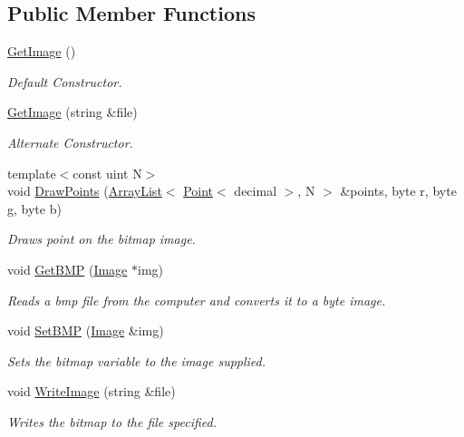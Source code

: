 \subsection*{Public Member Functions}
\begin{DoxyCompactItemize}
\item 
\mbox{\label{classnix_1_1GetImage_a536cbe8b7e89fac6c9b7bf2b85866a44}} 
\hyperlink{classnix_1_1GetImage_a536cbe8b7e89fac6c9b7bf2b85866a44}{Get\+Image} ()
\begin{DoxyCompactList}\small\item\em Default Constructor. \end{DoxyCompactList}\item 
\hyperlink{classnix_1_1GetImage_aa56441c4e8c2ad40725e4ae3d4a20976}{Get\+Image} (string \&file)
\begin{DoxyCompactList}\small\item\em Alternate Constructor. \end{DoxyCompactList}\item 
{\footnotesize template$<$const uint N$>$ }\\void \hyperlink{classnix_1_1GetImage_a85a80ac19ce8cbb20ef873554f728535}{Draw\+Points} (\hyperlink{classutil_1_1ArrayList}{Array\+List}$<$ \hyperlink{classutil_1_1Point}{Point}$<$ decimal $>$, N $>$ \&points, byte r, byte g, byte b)
\begin{DoxyCompactList}\small\item\em Draws point on the bitmap image. \end{DoxyCompactList}\item 
void \hyperlink{classnix_1_1GetImage_a4b0d8789ce2e70585664262c6109ed89}{Get\+B\+MP} (\hyperlink{classimage__processing_1_1Image}{Image} $\ast$img)
\begin{DoxyCompactList}\small\item\em Reads a bmp file from the computer and converts it to a byte image. \end{DoxyCompactList}\item 
void \hyperlink{classnix_1_1GetImage_abe75e9f38ce1d1a8c44af1f56f57e342}{Set\+B\+MP} (\hyperlink{classimage__processing_1_1Image}{Image} \&img)
\begin{DoxyCompactList}\small\item\em Sets the bitmap variable to the image supplied. \end{DoxyCompactList}\item 
void \hyperlink{classnix_1_1GetImage_afcd6ae5e71996de60bd0b9204649e322}{Write\+Image} (string \&file)
\begin{DoxyCompactList}\small\item\em Writes the bitmap to the file specified. \end{DoxyCompactList}\end{DoxyCompactItemize}


